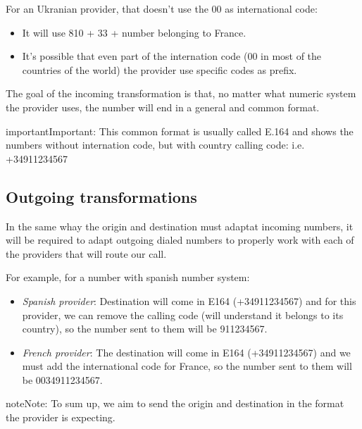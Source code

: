 \documentclass[letterpaper,10pt,english]{sphinxmanual}
\begin{document}
For an Ukranian provider, that doesn't use the 00 as international code:
\begin{itemize}
\item {} 
It will use 810 + 33 + number belonging to France.

\item {} 
It's possible that even part of the internation code (00 in most of the
countries of the world) the provider use specific codes as prefix.

\end{itemize}

The goal of the incoming transformation is that, no matter what numeric system
the provider uses, the number will end in a general and common format.
\label{brand/transformations/index:e164}
\begin{notice}{important}{Important:}
This common format is usually called E.164 and shows the numbers
without internation code, but with country calling code: i.e. +34911234567
\end{notice}


\subsection{Outgoing transformations}
\label{brand/transformations/index:outgoing-transformations}
In the same whay the origin and destination must adaptat incoming numbers, it
will be required to adapt outgoing dialed numbers to properly work with each
of the providers that will route our call.

For example, for a number with spanish number system:
\begin{itemize}
\item {} 
\emph{Spanish provider}: Destination will come in E164 (+34911234567) and for this
provider, we can remove the calling code (will understand it belongs to
its country), so the number sent to them will be 911234567.

\item {} 
\emph{French provider}: The destination will come in E164 (+34911234567) and we must
add the international code for France, so the number sent to them will be
0034911234567.

\end{itemize}

\begin{notice}{note}{Note:}
To sum up, we aim to send the origin and destination in the format the
provider is expecting.
\end{notice}
\end{document}
